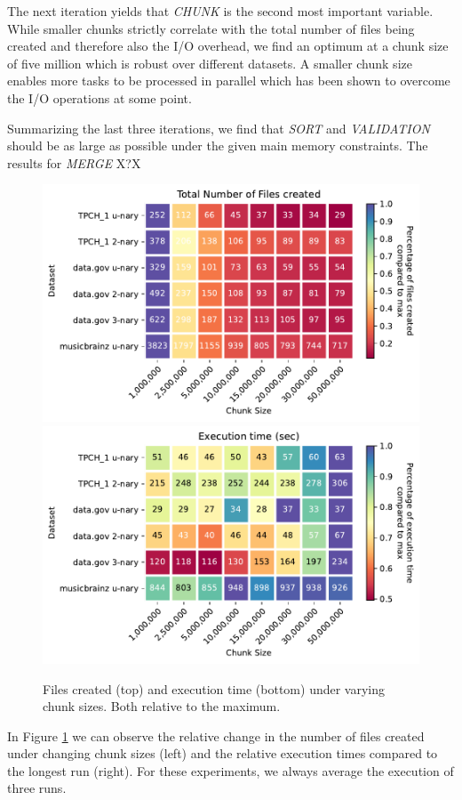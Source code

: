 The next iteration yields that \textit{CHUNK} is the second most important variable. While smaller chunks strictly correlate with the total number of files being created and therefore also the I/O overhead, we find an optimum at a chunk size of five million which is robust over different datasets. A smaller chunk size enables more tasks to be processed in parallel which has been shown to overcome the I/O operations at some point.

Summarizing the last three iterations, we find that \textit{SORT} and \textit{VALIDATION} should be as large as possible under the given main memory constraints. The results for \textit{MERGE} X?X %

\begin{figure}[h]
    \centering
    \includegraphics[width=.47\textwidth]{figures/chunk_size_files_created.pdf}
    \includegraphics[width=.47\textwidth]{figures/chunk_size_execution_time.pdf}
    \caption{Files created (top) and execution time (bottom) under varying chunk sizes. Both relative to the maximum.}
    \label{fig:chunk_size}
\end{figure}

In Figure \ref{fig:chunk_size} we can observe the relative change in the number of files created under changing chunk sizes (left) and the relative execution times compared to the longest run (right). For these experiments, we always average the execution of three runs.

